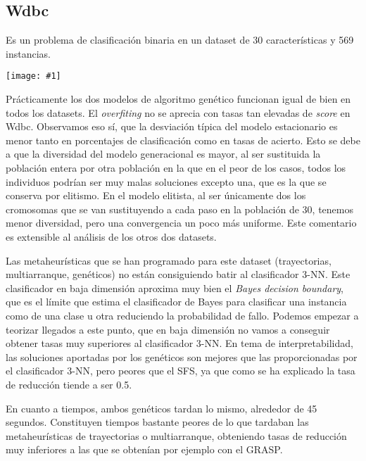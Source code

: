 \documentclass[a4paper,11pt]{article}
\newcommand{\imagen}[4]{
  \begin{minipage}{\linewidth}
    \centering
    \texttt{[image: \#1]}
    \captionof{figure}{#2}
    \label{#3}
  \end{minipage} 
}
\newcommand{\imgn}[3]{
  \begin{minipage}{\linewidth}
    \centering
    \texttt{[image: \#1]}
    \captionof{figure}{#2}
  \end{minipage} 
}
\begin{document}
  \subsection{Wdbc}
  
  Es un problema de clasificación binaria en un dataset de 30 características y 569 instancias.
  
  \imagen{../data/genetic/wdbc.png}{Tasas de clasificación en Wdbc}{wdbcgraph}{0.7}
  
  
  Prácticamente los dos modelos de algoritmo genético funcionan igual de bien en todos los datasets. El \textit{overfiting} no
  se aprecia con tasas tan elevadas de \textit{score} en Wdbc. Observamos eso sí, que la desviación típica del modelo estacionario es
  menor tanto en porcentajes de clasificación como en tasas de acierto. Esto se debe a que la diversidad del modelo generacional
  es mayor, al ser sustituida la población entera por otra población en la que en el peor de los casos, todos los individuos
  podrían ser muy malas soluciones excepto una, que es la que se conserva por elitismo. En el modelo elitista, al ser únicamente
  dos los cromosomas que se van sustituyendo a cada paso en la población de 30, tenemos menor diversidad, pero una convergencia
  un poco más uniforme. Este comentario es extensible al análisis de los otros dos datasets.
  
  Las metaheurísticas que se han programado para este dataset (trayectorias, multiarranque, genéticos) no están consiguiendo
  batir al clasificador 3-NN. Este clasificador en baja dimensión aproxima muy bien el \textit{Bayes decision boundary}, que es
  el límite que estima el clasificador de Bayes para clasificar una instancia como de una clase u otra reduciendo la probabilidad
  de fallo. Podemos empezar a teorizar llegados a este punto, que en baja dimensión no vamos a conseguir obtener tasas muy
  superiores al clasificador 3-NN. En tema de interpretabilidad, las soluciones aportadas por los genéticos son mejores 
  que las proporcionadas por el clasificador 3-NN, pero peores que el SFS, ya que como se ha explicado la tasa de 
  reducción tiende a ser 0.5.
  
  En cuanto a tiempos, ambos genéticos tardan lo mismo, alrededor de 45 segundos. Constituyen tiempos bastante peores de 
  lo que tardaban las metaheurísticas de trayectorias o multiarranque, obteniendo tasas de reducción muy inferiores a las
  que se obtenían por ejemplo con el GRASP.
  
\end{document}
